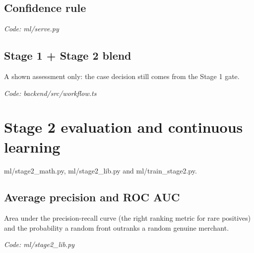 \documentclass[11pt,a4paper]{article}
\newcommand{\where}[1]{\par{\small\itshape\color{mute}Code: #1}\par}
\begin{document}
\subsection*{Confidence rule}
\par\smallskip\noindent{}\par\smallskip
\where{ml/serve.py}

\subsection*{Stage 1 + Stage 2 blend}
\par\smallskip\noindent{}\par\smallskip
\par\smallskip\noindent{}\par\smallskip
A shown assessment only: the case decision still comes from the Stage 1 gate.
\where{backend/src/workflow.ts}

\clearpage
\section{Stage 2 evaluation and continuous learning}
{\color{mute}ml/stage2\_math.py, ml/stage2\_lib.py and ml/train\_stage2.py.}

\subsection*{Average precision and ROC AUC}
\par\smallskip\noindent{}\par\smallskip
Area under the precision-recall curve (the right ranking metric for rare positives) and the probability a random front outranks a random genuine merchant.
\where{ml/stage2\_lib.py}
\end{document}

